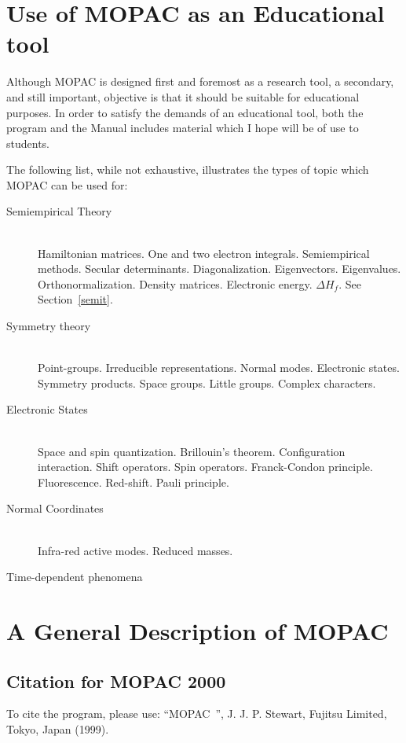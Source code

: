 \section{Use of MOPAC as an Educational tool}
Although MOPAC is designed first and foremost as a research tool, a secondary,
and still important, objective is that it should be suitable for educational
purposes. In order to satisfy the demands of an educational tool, both the
program and the Manual includes material which I hope will be of use to
students.

The following list, while not exhaustive, illustrates the types of topic which
MOPAC can be used for:

\begin{description}
\item[Semiempirical Theory]~\\
Hamiltonian matrices. One and two electron
integrals. Semiempirical methods. Secular determinants. Diagonalization.
Eigenvectors. Eigenvalues. Orthonormalization. Density matrices. Electronic
energy.  $\Delta H_f$. See Section~\ref{semit}.

\item[Symmetry theory]~\\
Point-groups. Irreducible representations. Normal modes. Electronic states.
Symmetry products. Space groups. Little groups.  Complex characters.

\item[Electronic States]~\\
Space and spin quantization. Brillouin's theorem. Configuration interaction.
Shift operators. Spin operators. Franck-Condon principle. Fluorescence.
Red-shift.  Pauli principle.

\item[Normal Coordinates]~\\
Infra-red active modes.  Reduced masses.

\item[Time-dependent phenomena]
\end{description}

\section{A General Description of MOPAC}


\subsection{Citation for MOPAC 2000}
To cite the program, please use:
``MOPAC~\mopacversion '', J. J. P. Stewart,  Fujitsu Limited, Tokyo, Japan
(1999).


